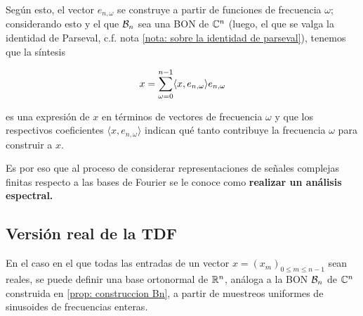 Según esto, el vector $e_{n,\omega}$ se construye a partir
de funciones de frecuencia $\omega$; considerando esto
y el que $\mathcal{B}_{n}$ sea una BON de $\mathbb{C}^{n}$ (luego, el
que se valga la identidad de Parseval,
c.f. nota \ref{nota: sobre la identidad de parseval}), tenemos que
la síntesis

\[
x = \sum\limits_{\omega=0}^{n-1}\langle x, e_{n,\omega} \rangle e_{n,\omega}
\]

\noindent
es una expresión de $x$ en términos de vectores de frecuencia
$\omega$ y que los respectivos coeficientes 
$\langle x, e_{n,\omega} \rangle$ indican qué tanto 
contribuye la frecuencia $\omega$ para construir a $x$.

Es por eso que al proceso de considerar representaciones
de señales complejas finitas respecto a las bases de Fourier
se le conoce como  
\textbf{realizar un análisis espectral.}


\subsection{Versión real de la TDF}

En el caso en el que todas las entradas de un vector
$x = (x_{m})_{0 \leq m \leq n-1}$ sean reales, se puede definir
una base ortonormal de $\mathbb{R}^{n}$, 
análoga a la BON $\mathcal{B}_{n}$ de $\mathbb{C}^{n}$ construida en 
\ref{prop: construccion Bn},
a partir de muestreos uniformes
de sinusoides de frecuencias enteras.


